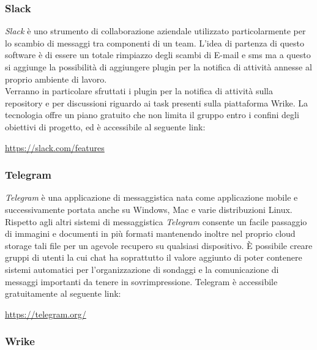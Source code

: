 \documentclass[../NormediProgetto.tex]{subfiles}
\begin{document}
	\subsubsection{Slack}
	
	\textit{Slack} è uno strumento di collaborazione aziendale utilizzato particolarmente per lo scambio di messaggi tra componenti di un team. L'idea di partenza di questo software è di essere un totale rimpiazzo degli scambi di E-mail e sms ma a questo si aggiunge la possibilità di aggiungere plugin per la notifica di attività annesse al proprio ambiente di lavoro.
	\\ \noindent Verranno in particolare sfruttati i plugin per la notifica di attività sulla repository e per discussioni riguardo ai task presenti sulla piattaforma Wrike. La tecnologia offre un piano gratuito che non limita il gruppo entro i confini degli obiettivi di progetto, ed è accessibile al seguente link:
	\begin{center}
		\url{https://slack.com/features}
	\end{center}
	
	\subsubsection{Telegram}
	
	\textit{Telegram} è una applicazione di messaggistica nata come applicazione mobile e successivamente portata anche su Windows, Mac e varie distribuzioni Linux. Rispetto agli altri sistemi di messaggistica \textit{Telegram} consente un facile passaggio di immagini e documenti in più formati mantenendo inoltre nel proprio cloud storage tali file per un agevole recupero su qualsiasi dispositivo. È possibile creare gruppi di utenti la cui chat ha soprattutto il valore aggiunto di poter contenere sistemi automatici per l'organizzazione di sondaggi e la comunicazione di messaggi importanti da tenere in sovrimpressione. Telegram è accessibile gratuitamente al seguente link:
	\begin{center}
		\url{https://telegram.org/}
	\end{center}
	
	\subsubsection{Wrike}
	
\end{document}
